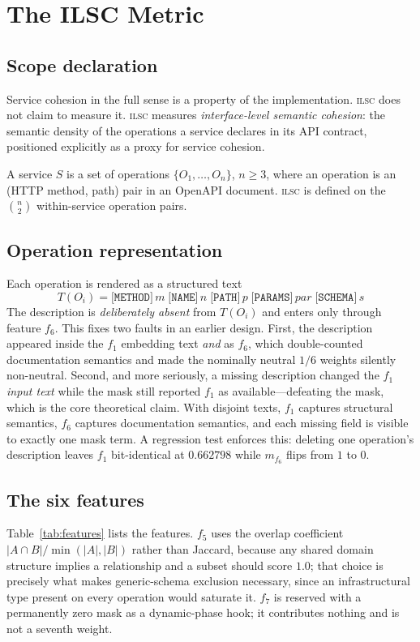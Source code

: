 \documentclass[journal]{IEEEtran}
\newcommand{\ilsc}{\textsc{ilsc}}
\begin{document}
\section{The ILSC Metric}
\label{sec:model}

\subsection{Scope declaration}
Service cohesion in the full sense is a property of the implementation. \ilsc{}
does not claim to measure it. \ilsc{} measures \emph{interface-level semantic
cohesion}: the semantic density of the operations a service declares in its API
contract, positioned explicitly as a proxy for service cohesion.

A service $S$ is a set of operations $\{O_1,\dots,O_n\}$, $n \ge 3$, where an
operation is an (HTTP method, path) pair in an OpenAPI document. \ilsc{} is
defined on the $\binom{n}{2}$ within-service operation pairs.

\subsection{Operation representation}
\label{sec:model-text}
Each operation is rendered as a structured text
\begin{equation}
T(O_i) = \texttt{[METHOD]}\,m\;\texttt{[NAME]}\,n\;\texttt{[PATH]}\,p\;
         \texttt{[PARAMS]}\,\mathit{par}\;\texttt{[SCHEMA]}\,s
\label{eq:text}
\end{equation}
The description is \emph{deliberately absent} from $T(O_i)$ and enters only
through feature $f_6$. This fixes two faults in an earlier design. First, the
description appeared inside the $f_1$ embedding text \emph{and} as $f_6$, which
double-counted documentation semantics and made the nominally neutral $1/6$
weights silently non-neutral. Second, and more seriously, a missing description
changed the $f_1$ \emph{input text} while the mask still reported $f_1$ as
available---defeating the mask, which is the core theoretical claim. With
disjoint texts, $f_1$ captures structural semantics, $f_6$ captures
documentation semantics, and each missing field is visible to exactly one mask
term. A regression test enforces this: deleting one operation's description
leaves $f_1$ bit-identical at $0.662798$ while $m_{f_6}$ flips from $1$ to $0$.

\subsection{The six features}
Table~\ref{tab:features} lists the features. $f_5$ uses the overlap coefficient
$|A \cap B| / \min(|A|,|B|)$ rather than Jaccard, because any shared domain
structure implies a relationship and a subset should score $1.0$; that choice is
precisely what makes generic-schema exclusion necessary, since an
infrastructural type present on every operation would saturate it. $f_7$ is
reserved with a permanently zero mask as a dynamic-phase hook; it contributes
nothing and is not a seventh weight.
\end{document}
